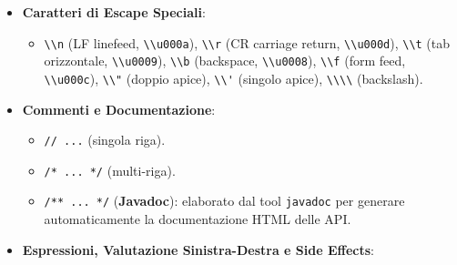 \documentclass[11pt,a4paper,oneside]{report}
\newcommand{\passthrough}[1]{#1}
\providecommand{\tightlist}{\setlength{\itemsep}{0pt}\setlength{\parskip}{0pt}}
\begin{document}
\begin{itemize}
\begin{itemize}
    \begin{itemize}
    \tightlist
    \item
      \textbf{Classi}: \passthrough{\lstinline!UpperCamelCase!} (es.
      \passthrough{\lstinline!SimpleDate!},
      \passthrough{\lstinline!MainDate!}).
    \item
      \textbf{Metodi, variabili locali, campi e parametri}:
      \passthrough{\lstinline!lowerCamelCase!} (es.
      \passthrough{\lstinline!daysPerMonth!},
      \passthrough{\lstinline!myCar!}).
    \item
      \textbf{Costanti}: \passthrough{\lstinline!UPPER\_SNAKE\_CASE!}
      (es. \passthrough{\lstinline!FORMAT!},
      \passthrough{\lstinline!PI\_CONST!}).
    \end{itemize}
  \end{itemize}
\item
  \textbf{Caratteri di Escape Speciali}:

  \begin{itemize}
  \tightlist
  \item
    \passthrough{\lstinline!\\n!} (LF linefeed,
    \passthrough{\lstinline!\\u000a!}), \passthrough{\lstinline!\\r!}
    (CR carriage return, \passthrough{\lstinline!\\u000d!}),
    \passthrough{\lstinline!\\t!} (tab orizzontale,
    \passthrough{\lstinline!\\u0009!}), \passthrough{\lstinline!\\b!}
    (backspace, \passthrough{\lstinline!\\u0008!}),
    \passthrough{\lstinline!\\f!} (form feed,
    \passthrough{\lstinline!\\u000c!}), \passthrough{\lstinline!\\"!}
    (doppio apice), \passthrough{\lstinline!\\'!} (singolo apice),
    \passthrough{\lstinline!\\\\!} (backslash).
  \end{itemize}
\item
  \textbf{Commenti e Documentazione}:

  \begin{itemize}
  \tightlist
  \item
    \passthrough{\lstinline!// ...!} (singola riga).
  \item
    \passthrough{\lstinline!/* ... */!} (multi-riga).
  \item
    \passthrough{\lstinline!/** ... */!} (\textbf{Javadoc}): elaborato
    dal tool \passthrough{\lstinline!javadoc!} per generare
    automaticamente la documentazione HTML delle API.
  \end{itemize}
\item
  \textbf{Espressioni, Valutazione Sinistra-Destra e Side Effects}:


\end{itemize}
\end{document}
